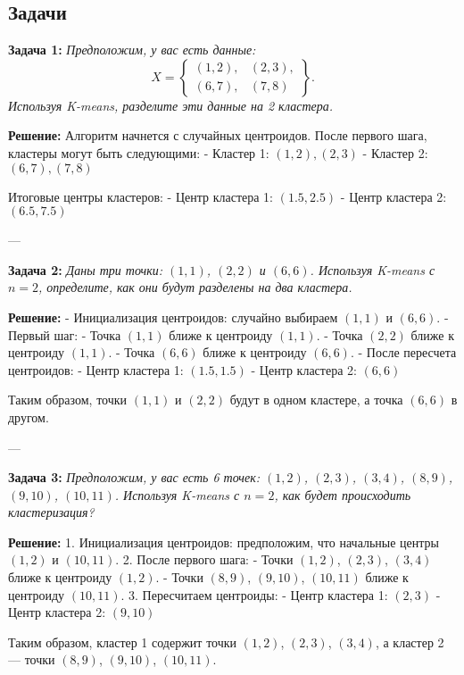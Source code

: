 \documentclass[a4paper,12pt]{article}
\begin{document}
\subsection*{Задачи}

\textbf{Задача 1:} \textit{Предположим, у вас есть данные:} 
\[
X = \left\{
\begin{array}{cc}
(1, 2), & (2, 3), \\
(6, 7), & (7, 8)
\end{array}
\right\}.
\]
\textit{Используя K-means, разделите эти данные на 2 кластера.}

\textbf{Решение:}  
Алгоритм начнется с случайных центроидов. После первого шага, кластеры могут быть следующими:
- Кластер 1: $(1, 2), (2, 3)$
- Кластер 2: $(6, 7), (7, 8)$

Итоговые центры кластеров:
- Центр кластера 1: $(1.5, 2.5)$
- Центр кластера 2: $(6.5, 7.5)$

---

\textbf{Задача 2:} \textit{Даны три точки: $(1, 1)$, $(2, 2)$ и $(6, 6)$. Используя K-means с $n=2$, определите, как они будут разделены на два кластера.}

\textbf{Решение:}  
- Инициализация центроидов: случайно выбираем $(1, 1)$ и $(6, 6)$.
- Первый шаг:
  - Точка $(1, 1)$ ближе к центроиду $(1, 1)$.
  - Точка $(2, 2)$ ближе к центроиду $(1, 1)$.
  - Точка $(6, 6)$ ближе к центроиду $(6, 6)$.
- После пересчета центроидов:
  - Центр кластера 1: $(1.5, 1.5)$
  - Центр кластера 2: $(6, 6)$
  
Таким образом, точки $(1, 1)$ и $(2, 2)$ будут в одном кластере, а точка $(6, 6)$ в другом.

---

\textbf{Задача 3:} \textit{Предположим, у вас есть 6 точек: $(1, 2)$, $(2, 3)$, $(3, 4)$, $(8, 9)$, $(9, 10)$, $(10, 11)$. Используя K-means с $n=2$, как будет происходить кластеризация?}

\textbf{Решение:}  
1. Инициализация центроидов: предположим, что начальные центры $(1, 2)$ и $(10, 11)$.
2. После первого шага:
   - Точки $(1, 2)$, $(2, 3)$, $(3, 4)$ ближе к центроиду $(1, 2)$.
   - Точки $(8, 9)$, $(9, 10)$, $(10, 11)$ ближе к центроиду $(10, 11)$.
3. Пересчитаем центроиды:
   - Центр кластера 1: $(2, 3)$
   - Центр кластера 2: $(9, 10)$

Таким образом, кластер 1 содержит точки $(1, 2)$, $(2, 3)$, $(3, 4)$, а кластер 2 — точки $(8, 9)$, $(9, 10)$, $(10, 11)$.
\end{document}

